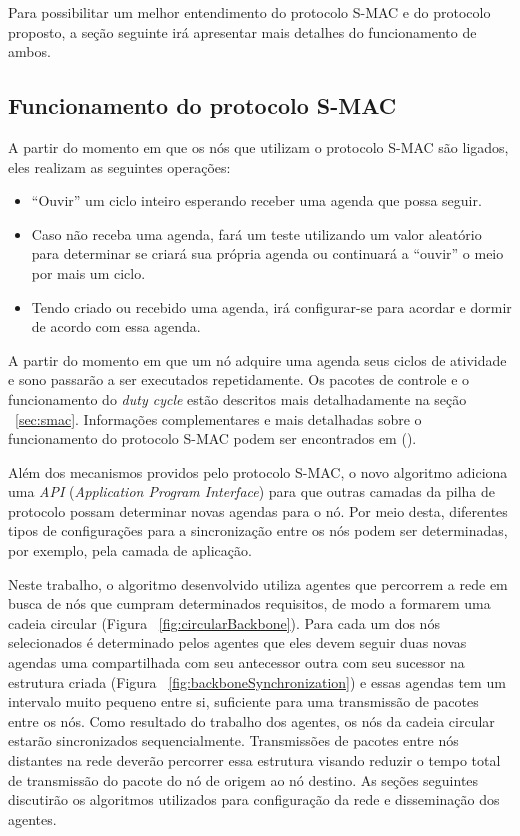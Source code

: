 Para possibilitar um melhor entendimento do protocolo S-MAC e do protocolo proposto, a seção seguinte irá apresentar mais detalhes do funcionamento de ambos.

\subsection{Funcionamento do protocolo S-MAC}

A partir do momento em que os nós que utilizam o protocolo S-MAC são ligados, eles realizam as seguintes operações:

\begin{itemize}
	\item ``Ouvir'' um ciclo inteiro esperando receber uma agenda que possa seguir.
	\item Caso não receba uma agenda, fará um teste utilizando um valor aleatório para determinar se criará sua própria agenda ou continuará a ``ouvir'' o meio por mais um ciclo.
	\item Tendo criado ou recebido uma agenda, irá configurar-se para acordar e dormir de acordo com essa agenda.
\end{itemize}

A partir do momento em que um nó adquire uma agenda seus ciclos de atividade e sono passarão a ser executados repetidamente. Os pacotes de controle e o funcionamento do \emph{duty cycle} estão descritos mais detalhadamente na seção ~\ref{sec:smac}. Informações complementares e mais detalhadas sobre o funcionamento do protocolo S-MAC podem ser encontrados em  (\citeyear{ye04}). 

Além dos mecanismos providos pelo protocolo S-MAC, o novo algoritmo adiciona uma \emph{API} (\emph{Application Program Interface}) para que outras camadas da pilha de protocolo possam determinar novas agendas para o nó. Por meio desta, diferentes tipos de configurações para a sincronização entre os nós podem ser determinadas, por exemplo, pela camada de aplicação.

Neste trabalho, o algoritmo desenvolvido utiliza agentes que percorrem a rede em busca de nós que cumpram determinados requisitos, de modo a formarem uma cadeia circular (Figura ~\ref{fig:circularBackbone}). Para cada um dos nós selecionados é determinado pelos agentes que eles devem seguir duas novas agendas uma compartilhada com seu antecessor outra com seu sucessor na estrutura criada (Figura ~\ref{fig:backboneSynchronization}) e essas agendas tem um intervalo muito pequeno entre si, suficiente para uma transmissão de pacotes entre os nós. Como resultado do trabalho dos agentes, os nós da cadeia circular estarão sincronizados sequencialmente. Transmissões de pacotes entre nós distantes na rede deverão percorrer essa estrutura visando reduzir o tempo total de transmissão do pacote do nó de origem ao nó destino. As seções seguintes discutirão os algoritmos utilizados para configuração da rede e disseminação dos agentes.

